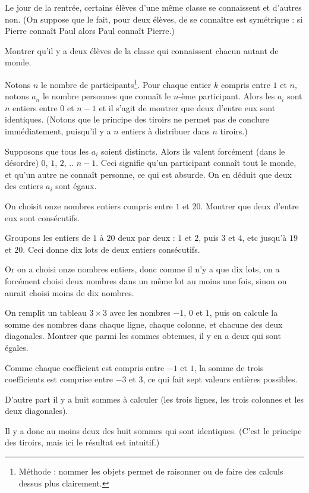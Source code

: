 \begin{exo}
Le jour de la rentrée, certains élèves d'une même classe se connaissent et d'autres non. (On suppose que le fait, pour deux élèves, de se connaître est symétrique : si Pierre connaît Paul alors Paul connaît Pierre.)

Montrer qu'il y a deux élèves de la classe qui connaissent chacun autant de monde.
\begin{sol}
Notons $n$ le nombre de participants\footnote{Méthode : nommer les objets permet de raisonner ou de faire des calculs dessus plus clairement.}. Pour chaque entier $k$ compris entre $1$ et $n$, notons $a_n$ le nombre personnes que connaît le $n$-ème participant. Alors les $a_i$ sont $n$ entiers entre $0$ et $n-1$ et il s'agit de montrer que deux d'entre eux sont identiques. (Notons que le principe des tiroirs ne permet pas de conclure immédiatement, puisqu'il y a $n$ entiers à distribuer dans $n$ tiroirs.)

Supposons que tous les $a_i$ soient distincts. Alors ils valent forcément (dans le désordre) $0$, $1$, $2$, .. $n-1$. Ceci signifie qu'un participant connaît tout le monde, et qu'un autre ne connaît personne, ce qui est absurde. On en déduit que deux des entiers $a_i$ sont égaux.
\end{sol}
\end{exo}

\begin{exo}
On choisit onze nombres entiers compris entre $1$ et $20$. Montrer que deux d'entre eux sont consécutifs.

\begin{sol}
Groupons les entiers de $1$ à $20$ deux par deux : $1$ et $2$, puis $3$ et $4$, etc jusqu'à $19$ et $20$. Ceci donne dix \og lots\fg{} de deux entiers consécutifs.

Or on a choisi onze nombres entiers, donc comme il n'y a que dix lots, on a forcément choisi deux nombres dans un même lot au moins une fois, sinon on aurait choisi moins de dix nombres.
\end{sol}
\end{exo}



\begin{exo}
On remplit un tableau $3\times 3$  avec les nombres $-1$, $0$ et $1$, puis on calcule la somme des nombres dans chaque ligne, chaque colonne, et chacune des deux diagonales. Montrer que parmi les sommes obtenues, il y en a deux qui sont égales.
\begin{sol}
Comme chaque coefficient est compris entre $-1$ et $1$, la somme de trois coefficients est comprise entre $-3$ et $3$, ce qui fait sept valeurs entières possibles.

D'autre part il y a huit sommes à calculer (les trois lignes, les trois colonnes et les deux diagonales).

Il y a donc au moins deux des huit sommes qui sont identiques. (C'est le principe des tiroirs, mais ici le résultat est intuitif.)
\end{sol}
\end{exo}



